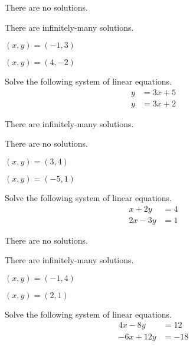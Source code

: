 \begin{readinessAssuranceTest}
\begin{multicols}{4}
\begin{readinessAssuranceTestChoices}
\item There are no solutions.
\item There are infinitely-many solutions.
\item \((x,y)=(-1,3)\) %
\item \((x,y)=(4,-2)\)
\end{readinessAssuranceTestChoices}
\end{multicols}


\item Solve the following system of linear equations.
      \begin{align*}
      y   &=  3x+5 \\
      y  &=  3x+2
      \end{align*}

\begin{multicols}{4}
\begin{readinessAssuranceTestChoices}
\item There are infinitely-many solutions.
\item There are no solutions. %
\item
\((x,y)=(3,4)\)
\item
\((x,y)=(-5,1)\)
\end{readinessAssuranceTestChoices}
\end{multicols}


\item Solve the following system of linear equations.
      \begin{align*}
      x+2y   &=   4 \\
      2x-3y  &=  1
      \end{align*}

\begin{multicols}{4}
\begin{readinessAssuranceTestChoices}
\item There are no solutions.
\item There are infinitely-many solutions.
\item
\((x,y)=(-1,4)\)
\item
\((x,y)=(2,1)\) %
\end{readinessAssuranceTestChoices}
\end{multicols}


\item Solve the following system of linear equations.
      \begin{align*}
      4x-8y   &= 12 \\
      -6x+12y  &=  -18
      \end{align*}


\end{readinessAssuranceTest}
